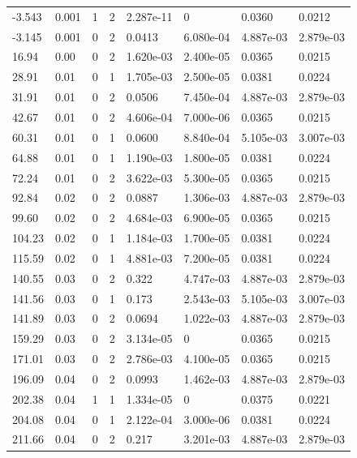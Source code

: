 \documentclass[preview]{standalone}
\begin{document}
{{\begin{tabular}{L{1.2cm}C{1.2cm} C{0.3cm}C{0.5cm} C{1.4cm}C{1.4cm} C{1.4cm}C{1.4cm}}
  -3.543  &  0.001  & 1     &  2 &  2.287e-11  & 0  & 0.0360 &  0.0212   \\ 
  -3.145  &  0.001  & 0     &  2 &  0.0413  & 6.080e-04  & 4.887e-03 &  2.879e-03   \\ 
  16.94  &  0.00  & 0     &  2 &  1.620e-03  & 2.400e-05  & 0.0365 &  0.0215   \\ 
  28.91  &  0.01  & 0     &  1 &  1.705e-03  & 2.500e-05  & 0.0381 &  0.0224   \\ 
  31.91  &  0.01  & 0     &  2 &  0.0506  & 7.450e-04  & 4.887e-03 &  2.879e-03   \\ 
  42.67  &  0.01  & 0     &  2 &  4.606e-04  & 7.000e-06  & 0.0365 &  0.0215   \\ 
  60.31  &  0.01  & 0     &  1 &  0.0600  & 8.840e-04  & 5.105e-03 &  3.007e-03   \\ 
  64.88  &  0.01  & 0     &  1 &  1.190e-03  & 1.800e-05  & 0.0381 &  0.0224   \\ 
  72.24  &  0.01  & 0     &  2 &  3.622e-03  & 5.300e-05  & 0.0365 &  0.0215   \\ 
  92.84  &  0.02  & 0     &  2 &  0.0887  & 1.306e-03  & 4.887e-03 &  2.879e-03   \\ 
  99.60  &  0.02  & 0     &  2 &  4.684e-03  & 6.900e-05  & 0.0365 &  0.0215   \\ 
  104.23  &  0.02  & 0     &  1 &  1.184e-03  & 1.700e-05  & 0.0381 &  0.0224   \\ 
  115.59  &  0.02  & 0     &  1 &  4.881e-03  & 7.200e-05  & 0.0381 &  0.0224   \\ 
  140.55  &  0.03  & 0     &  2 &  0.322  & 4.747e-03  & 4.887e-03 &  2.879e-03   \\ 
  141.56  &  0.03  & 0     &  1 &  0.173  & 2.543e-03  & 5.105e-03 &  3.007e-03   \\ 
  141.89  &  0.03  & 0     &  2 &  0.0694  & 1.022e-03  & 4.887e-03 &  2.879e-03   \\ 
  159.29  &  0.03  & 0     &  2 &  3.134e-05  & 0  & 0.0365 &  0.0215   \\ 
  171.01  &  0.03  & 0     &  2 &  2.786e-03  & 4.100e-05  & 0.0365 &  0.0215   \\ 
  196.09  &  0.04  & 0     &  2 &  0.0993  & 1.462e-03  & 4.887e-03 &  2.879e-03   \\ 
  202.38  &  0.04  & 1     &  1 &  1.334e-05  & 0  & 0.0375 &  0.0221   \\ 
  204.08  &  0.04  & 0     &  1 &  2.122e-04  & 3.000e-06  & 0.0381 &  0.0224   \\ 
  211.66  &  0.04  & 0     &  2 &  0.217  & 3.201e-03  & 4.887e-03 &  2.879e-03   \\ 

\end{tabular}}}
\end{document}
